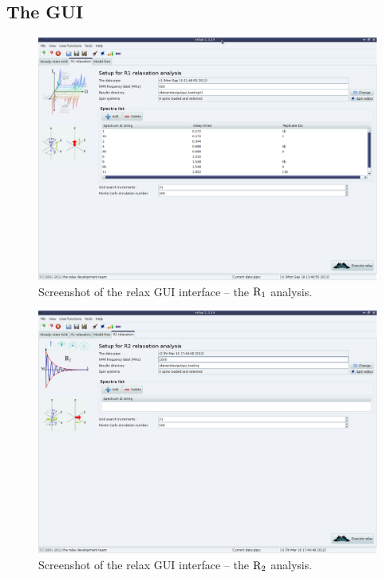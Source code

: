 
\subsection{The GUI}

\begin{figure}
\centerline{\includegraphics[width=\textwidth, bb=14 14 1065 768]{graphics/screenshots/analysis_r1}}
\caption[GUI screenshot -- $\Rone$ analysis]{Screenshot of the relax GUI interface -- the $\Rone$ analysis.}\label{fig: screenshot: R1 analysis}
\end{figure}


\begin{figure}
\centerline{\includegraphics[width=\textwidth, bb=14 14 1065 768]{graphics/screenshots/analysis_r2}}
\caption[GUI screenshot -- $\Rtwo$ analysis]{Screenshot of the relax GUI interface -- the $\Rtwo$ analysis.}\label{fig: screenshot: R2 analysis}
\end{figure}

